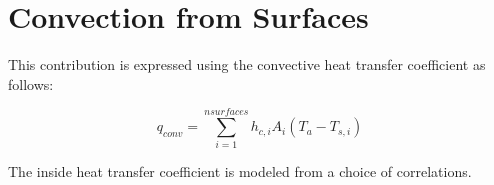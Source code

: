 \section{Convection from Surfaces}\label{convection-from-surfaces}

This contribution is expressed using the convective heat transfer coefficient as follows:

\begin{equation}
{q_{conv}} = \sum\limits_{i = 1}^{nsurfaces} {{h_{c,i}}{A_i}\left( {{T_a} - {T_{s,i}}} \right)}
\end{equation}

The inside heat transfer coefficient is modeled from a choice of correlations.
